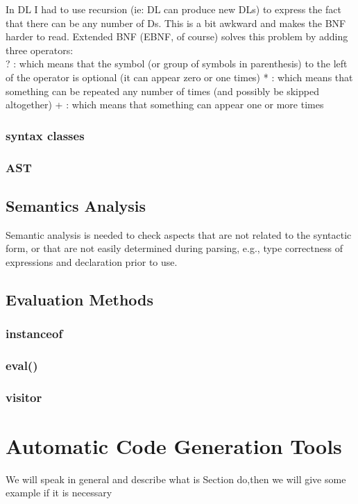 In DL I had to use recursion (ie: DL can produce new DLs) to express the fact that there can be any number of Ds. This is a bit awkward and makes the BNF harder to read. Extended BNF (EBNF, of course) solves this problem by adding three operators:\\

    ? : which means that the symbol (or group of symbols in parenthesis) to the left of the operator is optional (it can appear zero or one times)
    * : which means that something can be repeated any number of times (and possibly be skipped altogether)
    + : which means that something can appear one or more times



\subsubsection{syntax classes}

\subsubsection{AST}


\subsection{Semantics Analysis}
Semantic analysis is needed to check aspects that are not related to the syntactic form, or that are not easily determined during parsing, e.g., type correctness of expressions and declaration prior to use.
\subsection{Evaluation Methods}

\subsubsection{instanceof}

\subsubsection{ eval()}

\subsubsection{visitor}



\section{Automatic Code Generation Tools}
We will speak in general and describe what is Section do,then we will give some example if it is necessary


